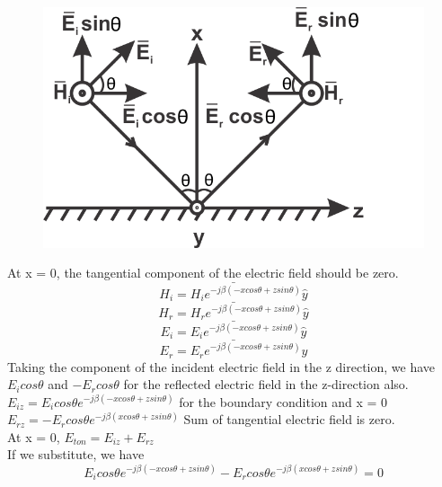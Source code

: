 \begin{figure}[h]
\centering
\includegraphics[scale=1]{./graphics/silas2}
\caption{}
\end{figure}
At x = 0, the tangential component of the electric field should be zero.
\begin{equation*}
\bar{H_{i} = H_{i} e^{-j\beta(-xcos\theta + zsin\theta)} \hat{y}}
\end{equation*}
\begin{equation*}
\bar{H_{r} = H_{r} e^{-j\beta(-xcos\theta + zsin\theta)} \hat{y}}
\end{equation*}
\begin{equation*}
\bar{E_{i} = E_{i} e^{-j\beta(-xcos\theta + zsin\theta)} \hat{y}}
\end{equation*}
\begin{equation*}
\bar{E_{r} = E_{r} e^{-j\beta(-xcos\theta + zsin\theta)} \hat{y}}
\end{equation*}
Taking the component of the incident electric field in the z direction, we have $E_{i} cos\theta$ and $-E_{r}cos\theta$ for the reflected electric field in the z-direction also.\\
$E_{iz} = E_{i}cos\theta e^{-j\beta(-xcos\theta + zsin\theta)}$	for the boundary condition and x = 0\\
$E_{rz} = -E_{r}cos\theta e^{-j\beta(xcos\theta + zsin\theta)}$   Sum of tangential electric field is zero.\\
At x = 0, $E_{ton} = E_{iz} + E_{rz}$\\
If we substitute, we have\\
\begin{equation*}
E_{i}cos\theta e^{-j\beta(-xcos\theta + zsin\theta)} - E_{r}cos\theta e^{-j\beta(xcos\theta + zsin\theta)} = 0
\end{equation*}

